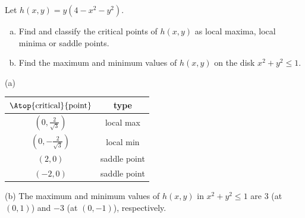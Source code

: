 \begin{question}[M200 2011A] %
Let $h(x, y) = y(4 - x^2 - y^2)$.
\begin{enumerate}[(a)]
\item
Find and classify the critical points of $h(x, y)$ as local maxima, local minima or 
saddle points.
\item
Find the maximum and minimum values of $h(x, y)$ on the disk $x^2 + y^2 \le 1$.
\end{enumerate}
\end{question}

%

\begin{answer}
(a)
\begin{center}
\renewcommand{\arraystretch}{1.3}
     \begin{tabular}{|c|c|}
     \hline
    $\Atop{\text{critical}}{\text{point}}$   & type \\    
    \hline
     $\left(0,\frac{2}{\sqrt{3}}\right)$  
            & local max  \\ \hline
     $\left(0,-\frac{2}{\sqrt{3}}\right)$  
            & local min \\  \hline
     $(2,0)$   & saddle point \\  \hline
     $(-2,0)$  & saddle point \\  \hline
     \end{tabular}
\renewcommand{\arraystretch}{1.0}
\end{center}

(b) The maximum and minimum values of $h(x,y)$ in $x^2+y^2\le 1$
     are $3$ (at $(0,1)$) and  $-3$ (at $(0,-1)$), respectively.
\end{answer}

